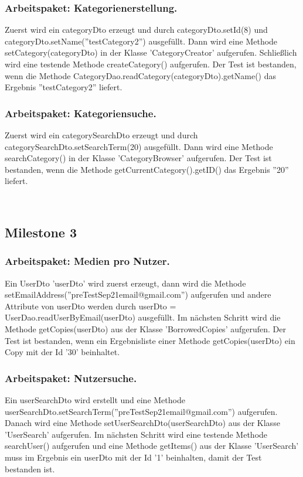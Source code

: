 \documentclass{article}
\begin{document}
\subsubsection{Arbeitspaket: Kategorienerstellung.}
Zuerst wird ein categoryDto erzeugt und durch categoryDto.setId(8) und \linebreak categoryDto.setName(''testCategory2'') ausgefüllt. Dann wird eine Methode \linebreak setCategory(categoryDto) in der Klasse 'CategoryCreator' aufgerufen. Schließlich wird eine testende Methode createCategory() aufgerufen. Der Test ist bestanden, wenn die Methode \linebreak CategoryDao.readCategory(categoryDto).getName() das Ergebnis ''testCategory2'' liefert.

\subsubsection{Arbeitspaket: Kategoriensuche.}
Zuerst wird ein categorySearchDto erzeugt und durch categorySearchDto.setSearchTerm(20) ausgefüllt. Dann wird eine Methode  searchCategory() in der Klasse 'CategoryBrowser' aufgerufen. Der Test ist bestanden, wenn die Methode  getCurrentCategory().getID() das Ergebnis ''20'' liefert.

­\subsection{Milestone 3}

\subsubsection{Arbeitspaket: Medien pro Nutzer.}
Ein UserDto 'userDto' wird zuerst erzeugt, dann wird die Methode \linebreak setEmailAddress(''preTestSep21email@gmail.com'') aufgerufen und andere Attribute von userDto werden durch userDto = UserDao.readUserByEmail(userDto) ausgefüllt. Im nächsten Schritt wird die Methode getCopies(userDto) aus der Klasse 'BorrowedCopies' aufgerufen. Der Test ist bestanden, wenn ein Ergebnisliste einer Methode getCopies(userDto) ein Copy mit der Id '30' beinhaltet.

\subsubsection{Arbeitspaket: Nutzersuche.}
Ein userSearchDto wird erstellt und eine Methode \linebreak userSearchDto.setSearchTerm(''preTestSep21email@gmail.com'') aufgerufen. Danach wird eine Methode setUserSearchDto(userSearchDto) aus der Klasse 'UserSearch' aufgerufen. Im nächsten Schritt wird eine testende Methode searchUser() aufgerufen und eine Methode getItems() aus der Klasse 'UserSearch' muss im Ergebnis ein userDto mit der Id '1' beinhalten, damit der Test bestanden ist. 
\end{document}
